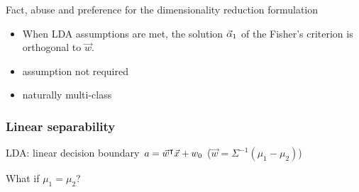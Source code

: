 \begin{frame}
\begin{block}{Fact, abuse and preference for the dimensionality reduction formulation}
\begin{itemize}
\item When LDA assumptions are met, the solution $\vec{\alpha}_1$ of the Fisher's criterion is orthogonal to $\vec{w}$. 
\item assumption not required
\item naturally multi-class
\end{itemize}
\end{block}

\end{frame}

\begin{frame}
\frametitle{Linear separability}

LDA: linear decision boundary $a = \vec{w}^\intercal \vec{x} + w_0$ ($\vec{w} = \Sigma^{-1}(\mu_1-\mu_2)$)
%
\begin{block}{}
\begin{huge}
\centering What if $\mu_1 = \mu_2$? 
\end{huge}
\end{block}

\end{frame}
